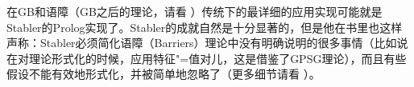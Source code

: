 在GB和语障（GB之后的理论，请看 \citealp{Chomsky86b}）传统下的最详细的应用实现可能就是Stabler的Prolog实现了\citeyearpar{Stabler92a-u}。Stabler的成就自然是十分显著的，但是他在书里也这样声称：Stabler必须简化语障（Barriers）理论中没有明确说明的很多事情（比如说在对\xbar 理论形式化的时候，应用特征"=值对儿，这是借鉴了GPSG理论\indexgpsg），而且有些假设不能有效地形式化，并被简单地忽略了（更多细节请看\citealp{Briscoe97a} ）。

